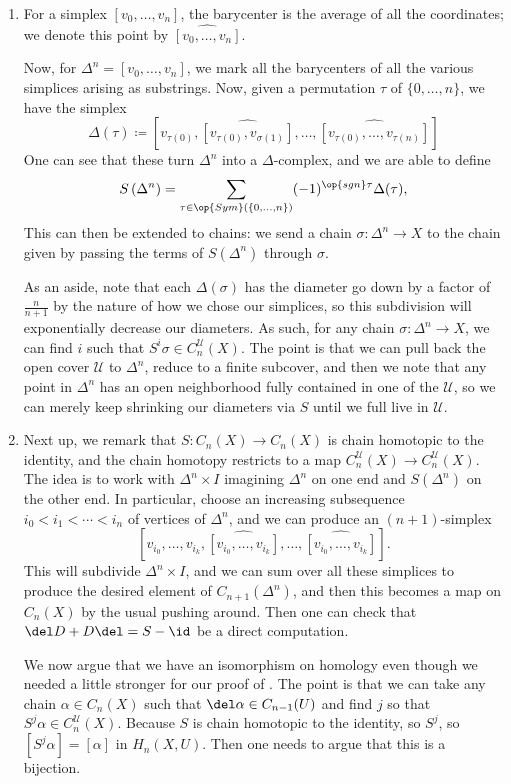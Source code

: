 \documentclass[../notes.tex]{subfiles}
\begin{document}
\begin{enumerate}
	\item For a simplex $[v_0,\ldots,v_n]$, the barycenter is the average of all the coordinates; we denote this point by $\widehat{[v_0,\ldots,v_n]}$.

	Now, for $\Delta^n=[v_0,\ldots,v_n]$, we mark all the barycenters of all the various simplices arising as substrings. Now, given a permutation $\tau$ of $\{0,\ldots,n\}$, we have the simplex
	\[\Delta(\tau)\coloneqq\left[v_{\tau(0)},\widehat{[v_{\tau(0)},v_{\sigma(1)}]},\ldots,\widehat{[v_{\tau(0)},\ldots,v_{\tau(n)}]}\right]\]
	One can see that these turn $\Delta^n$ into a $\Delta$-complex, and we are able to define
	\[S\left(\Delta^n\right)=\sum_{\tau\in\op{Sym}(\{0,\ldots,n\})}(-1)^{\op{sgn}\tau}\Delta(\tau),\]
	This can then be extended to chains: we send a chain $\sigma\colon\Delta^n\to X$ to the chain given by passing the terms of $S(\Delta^n)$ through $\sigma$.

	As an aside, note that each $\Delta(\sigma)$ has the diameter go down by a factor of $\frac n{n+1}$ by the nature of how we chose our simplices, so this subdivision will exponentially decrease our diameters. As such, for any chain $\sigma\colon\Delta^n\to X$, we can find $i$ such that $S^i\sigma\in C_n^{\mathcal U}(X)$. The point is that we can pull back the open cover $\mathcal U$ to $\Delta^n$, reduce to a finite subcover, and then we note that any point in $\Delta^n$ has an open neighborhood fully contained in one of the $\mathcal U$, so we can merely keep shrinking our diameters via $S$ until we full live in $\mathcal U$.

	\item Next up, we remark that $S\colon C_n(X)\to C_n(X)$ is chain homotopic to the identity, and the chain homotopy restricts to a map $C_n^{\mathcal U}(X)\to C_n^{\mathcal U}(X)$. The idea is to work with $\Delta^n\times I$ imagining $\Delta^n$ on one end and $S(\Delta^n)$ on the other end. In particular, choose an increasing subsequence $i_0<i_1<\cdots<i_n$ of vertices of $\Delta^n$, and we can produce an $(n+1)$-simplex
	\[\left[v_{i_0},\ldots,v_{i_k},\widehat{[v_{i_0},\ldots,v_{i_k}]},\ldots,\widehat{[v_{i_0},\ldots,v_{i_k}]}\right].\]
	This will subdivide $\Delta^n\times I$, and we can sum over all these simplices to produce the desired element of $C_{n+1}(\Delta^n)$, and then this becomes a map on $C_n(X)$ by the usual pushing around. Then one can check that $\del D+D\del=S-{\id}$ be a direct computation.
	
	We now argue that we have an isomorphism on homology even though we needed a little stronger for our proof of . The point is that we can take any chain $\alpha\in C_n(X)$ such that $\del\alpha\in C_{n-1}(U)$ and find $j$ so that $S^j\alpha\in C_n^{\mathcal U}(X)$. Because $S$ is chain homotopic to the identity, so $S^j$, so $\left[S^j\alpha\right]=[\alpha]$ in $H_n(X,U)$. Then one needs to argue that this is a bijection.
\end{enumerate}
\end{document}
